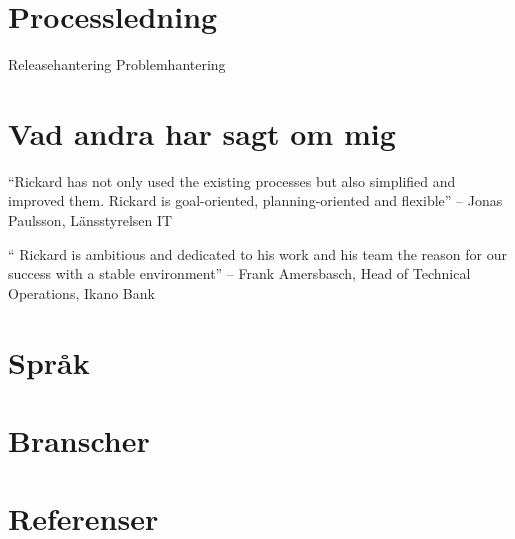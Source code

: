 \documentclass[11pt,a4paper,sans]{moderncv}
\begin{document}

\section{Processledning}
 {Releasehantering}
 {Problemhantering}










\section{Vad andra har sagt om mig}

\begin{quotelist}
\item  ``Rickard has not only used the existing processes but also simplified and improved them.
        Rickard is goal-oriented, planning-oriented and flexible''  -- Jonas Paulsson, L\"ansstyrelsen IT
\item
        `` Rickard is ambitious and dedicated to his work and his team the reason for our success with a stable environment''  -- Frank Amersbasch, Head of Technical Operations, Ikano Bank
  \end{quotelist}

\section{Spr\aa k}

\section{Branscher}

\section{Referenser}

\nocite{*}

\clearpage
\Large
\end{document}
